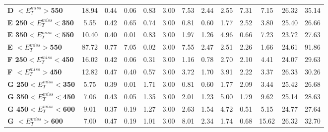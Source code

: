 \begin{table}[h]
\begin{center}
{\begin{tabular}{|l|cccccccccccc|}
\textbf{ D $<E_T^{miss}>$550}    & 18.94         & 0.44          & 0.06          & 0.83          & 3.00          & 7.53          & 2.44          & 2.55          & 7.31          & 7.15          & 26.32         & 35.14         \\
\textbf{ E 250$<E_T^{miss}<$350}         & 5.55          & 0.42          & 0.65          & 0.74          & 3.00          & 0.81          & 0.60          & 1.77          & 2.52          & 3.80          & 25.40         & 26.66         \\
\textbf{ E 350$<E_T^{miss}<$550}         & 10.40         & 0.40          & 0.01          & 0.83          & 3.00          & 1.97          & 1.26          & 4.96          & 0.66          & 7.23          & 23.72         & 27.63         \\
\textbf{ E $<E_T^{miss}>$550}    & 87.72         & 0.77          & 7.05          & 0.02          & 3.00          & 7.55          & 2.47          & 2.51          & 2.26          & 1.66          & 24.61         & 91.86         \\
\textbf{ F 250$<E_T^{miss}<$450}         & 16.02         & 0.42          & 0.06          & 0.31          & 3.00          & 1.16          & 0.78          & 2.70          & 2.10          & 4.41          & 24.07         & 29.63         \\
\textbf{ F $<E_T^{miss}>$450}    & 12.82         & 0.47          & 0.40          & 0.57          & 3.00          & 3.72          & 1.70          & 3.91          & 2.22          & 3.37          & 26.33         & 30.26         \\
\textbf{ G 250$<E_T^{miss}<$350}         & 5.75          & 0.39          & 0.01          & 1.71          & 3.00          & 0.81          & 0.60          & 1.77          & 2.09          & 3.44          & 25.42         & 26.68         \\
\textbf{ G 350$<E_T^{miss}<$450}         & 7.06          & 0.43          & 0.05          & 1.35          & 3.00          & 2.01          & 1.23          & 5.00          & 1.79          & 9.62          & 25.14         & 28.63         \\
\textbf{ G 450$<E_T^{miss}<$600}         & 9.01          & 0.37          & 0.19          & 1.27          & 3.00          & 2.63          & 1.54          & 4.72          & 0.51          & 5.15          & 24.77         & 27.64         \\
\textbf{ G $<E_T^{miss}>$600}    & 7.00          & 0.47          & 0.19          & 1.01          & 3.00          & 8.01          & 2.34          & 1.74          & 0.68          & 15.62         & 26.32         & 32.70         \\

\end{tabular}}
\end{center}
\end{table}
